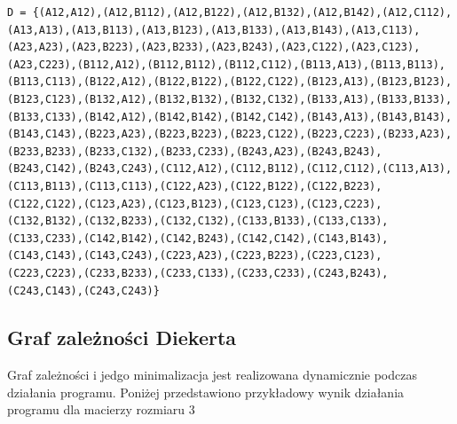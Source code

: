 \documentclass[12pt, letterpaper]{article}
\begin{document}
\begin{lstlisting}
D = {(A12,A12),(A12,B112),(A12,B122),(A12,B132),(A12,B142),(A12,C112),(A13,A13),(A13,B113),(A13,B123),(A13,B133),(A13,B143),(A13,C113),(A23,A23),(A23,B223),(A23,B233),(A23,B243),(A23,C122),(A23,C123),(A23,C223),(B112,A12),(B112,B112),(B112,C112),(B113,A13),(B113,B113),(B113,C113),(B122,A12),(B122,B122),(B122,C122),(B123,A13),(B123,B123),(B123,C123),(B132,A12),(B132,B132),(B132,C132),(B133,A13),(B133,B133),(B133,C133),(B142,A12),(B142,B142),(B142,C142),(B143,A13),(B143,B143),(B143,C143),(B223,A23),(B223,B223),(B223,C122),(B223,C223),(B233,A23),(B233,B233),(B233,C132),(B233,C233),(B243,A23),(B243,B243),(B243,C142),(B243,C243),(C112,A12),(C112,B112),(C112,C112),(C113,A13),(C113,B113),(C113,C113),(C122,A23),(C122,B122),(C122,B223),(C122,C122),(C123,A23),(C123,B123),(C123,C123),(C123,C223),(C132,B132),(C132,B233),(C132,C132),(C133,B133),(C133,C133),(C133,C233),(C142,B142),(C142,B243),(C142,C142),(C143,B143),(C143,C143),(C143,C243),(C223,A23),(C223,B223),(C223,C123),(C223,C223),(C233,B233),(C233,C133),(C233,C233),(C243,B243),(C243,C143),(C243,C243)}
\end{lstlisting}

\subsection{Graf zależności Diekerta}

Graf zależności i jedgo minimalizacja jest realizowana dynamicznie podczas działania programu. Poniżej przedstawiono przykładowy wynik działania programu dla macierzy rozmiaru 3
\end{document}

